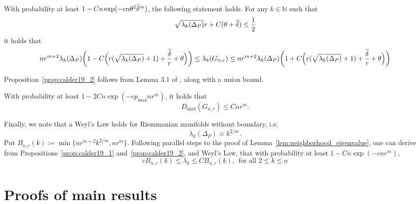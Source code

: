 \begin{proposition}
	\label{prop:calder19_1}
	With probability at least $1 - Cn\exp(-cn\theta^2\widetilde{\delta}^m)$, the following statement holds. For any $k \in \mathbb{N}$ such that
	\begin{equation*}
	\sqrt{\lambda_k(\Delta_P)}r + C(\theta + \widetilde{\delta}) \leq \frac{1}{2}
	\end{equation*} 
	it holds that
	\begin{equation*}
	nr^{m+2} \lambda_k(\Delta_P) \biggl(1 - C\Bigl(r(\sqrt{\lambda_k(\Delta_P)} + 1) + \frac{\widetilde{\delta}}{r} + \theta\Bigr)\biggr)\leq \lambda_k(G_{n,r}) \leq nr^{m+2} \lambda_k(\Delta_P) \biggl(1 + C\Bigl(r(\sqrt{\lambda_k(\Delta_P)} + 1) + \frac{\widetilde{\delta}}{r} + \theta\Bigr)\biggr)
	\end{equation*}
\end{proposition}

Proposition~\ref{prop:calder19_2} follows from Lemma 3.1 of \citet{calder2019}, along with a union bound.
\begin{proposition}
	\label{prop:calder19_2}
	With probability at least $1 - 2Cn\exp(-cp_{\max}nr^m)$, it holds that
	\begin{equation*}
	D_{\max}(G_{n,r}) \leq Cnr^{m}.
	\end{equation*}
\end{proposition}

Finally, we note that a Weyl's Law holds for Riemmanian manifolds without boundary, i.e.
\begin{equation*}
\lambda_k(\Delta_P) \asymp k^{2/m}.
\end{equation*}
Put $B_{n,r}(k) := \min\{nr^{m + 2}k^{2/m}, nr^m\}$. Following parallel steps to the proof of Lemma~\ref{lem:neighborhood_eigenvalue}, one can derive from Propositions~\ref{prop:calder19_1} and~\ref{prop:calder19_2}, and Weyl's Law, that with probability at least $1 - Cn\exp(-cnr^m)$, 
\begin{equation}
\label{eqn:neighborhood_eigenvalue_manifold}
cB_{n,r}(k) \leq \lambda_k \leq CB_{n,r}(k),~~\textrm{for all $2 \leq k \leq n$}
\end{equation}

\section{Proofs of main results}
\label{sec:main_results}

